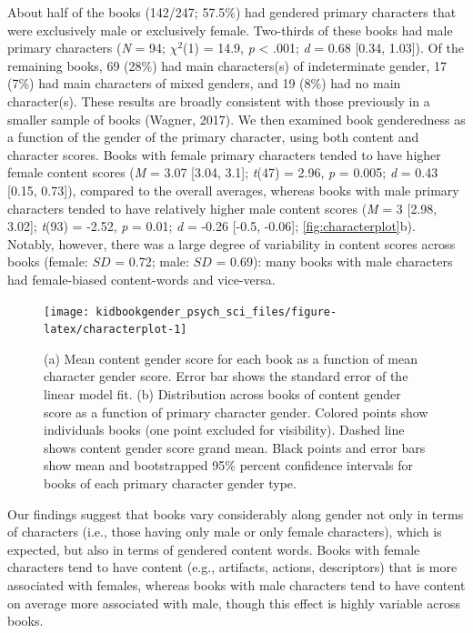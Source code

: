 \documentclass[
  english,
  ,man,floatsintext]{apa6}
\begin{document}
About half of the books (142/247; 57.5\%) had gendered primary characters that were exclusively male or exclusively female. Two-thirds of these books had male primary characters (\emph{N} = 94; \(\chi^2\)(1) = 14.9, \emph{p} \textless{} .001; \emph{d} = 0.68 {[}0.34, 1.03{]}). Of the remaining books, 69 (28\%) had main characters(s) of indeterminate gender, 17 (7\%) had main characters of mixed genders, and 19 (8\%) had no main character(s). These results are broadly consistent with those previously in a smaller sample of books (Wagner, 2017). We then examined book genderedness as a function of the gender of the primary character, using both content and character scores. Books with female primary characters tended to have higher female content scores (\emph{M} = 3.07 {[}3.04, 3.1{]}; \emph{t}(47) = 2.96, \emph{p} = 0.005; \emph{d} = 0.43 {[}0.15, 0.73{]}), compared to the overall averages, whereas books with male primary characters tended to have relatively higher male content scores (\emph{M} = 3 {[}2.98, 3.02{]}; \emph{t}(93) = -2.52, \emph{p} = 0.01; \emph{d} = -0.26 {[}-0.5, -0.06{]}; \autoref{fig:characterplot}b). Notably, however, there was a large degree of variability in content scores across books (female: \(SD\) = 0.72; male: \(SD\) = 0.69): many books with male characters had female-biased content-words and vice-versa.

\begin{figure}[t!]
\texttt{[image: kidbookgender\_psych\_sci\_files/figure-latex/characterplot-1]} \caption{(a) Mean content gender score for each book as a function of mean character gender score. Error bar shows the standard error of the linear model fit.  (b) Distribution across books of content gender score as a function of primary character gender. Colored points show individuals books (one point excluded for visibility). Dashed line shows content gender score grand mean. Black points and error bars show mean and bootstrapped 95\% percent confidence intervals for books of each primary character gender type.}\label{fig:characterplot}
\end{figure}

Our findings suggest that books vary considerably along gender not only in terms of characters (i.e., those having only male or only female characters), which is expected, but also in terms of gendered content words. Books with female characters tend to have content (e.g., artifacts, actions, descriptors) that is more associated with females, whereas books with male characters tend to have content on average more associated with male, though this effect is highly variable across books.
\end{document}

